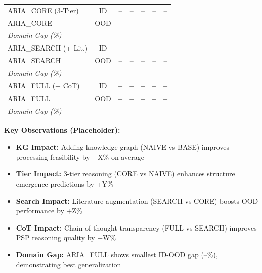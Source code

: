 \begin{table}[ht!]
\begin{tabular}{lcccccc}
ARIA\_CORE (3-Tier) & ID & -- & -- & -- & -- & -- \\
ARIA\_CORE & OOD & -- & -- & -- & -- & -- \\
\rowcolor{gray!10}
\textit{Domain Gap (\%)} & & \textit{--} & \textit{--} & \textit{--} & \textit{--} & \textit{--} \\
\midrule

ARIA\_SEARCH (+ Lit.) & ID & -- & -- & -- & -- & -- \\
ARIA\_SEARCH & OOD & -- & -- & -- & -- & -- \\
\rowcolor{gray!10}
\textit{Domain Gap (\%)} & & \textit{--} & \textit{--} & \textit{--} & \textit{--} & \textit{--} \\
\midrule

ARIA\_FULL (+ CoT) & ID & \textbf{--} & \textbf{--} & \textbf{--} & \textbf{--} & \textbf{--} \\
ARIA\_FULL & OOD & \textbf{--} & \textbf{--} & \textbf{--} & \textbf{--} & \textbf{--} \\
\rowcolor{gray!10}
\textit{Domain Gap (\%)} & & \textit{\textbf{--}} & \textit{\textbf{--}} & \textit{\textbf{--}} & \textit{\textbf{--}} & \textit{\textbf{--}} \\

\bottomrule
\end{tabular}
\vspace{0.3cm}

\noindent\textbf{Key Observations (Placeholder):}
\begin{itemize}[leftmargin=*,noitemsep]
    \item \textbf{KG Impact:} Adding knowledge graph (NAIVE vs BASE) improves processing feasibility by +X\% on average
    \item \textbf{Tier Impact:} 3-tier reasoning (CORE vs NAIVE) enhances structure emergence predictions by +Y\%
    \item \textbf{Search Impact:} Literature augmentation (SEARCH vs CORE) boosts OOD performance by +Z\%
    \item \textbf{CoT Impact:} Chain-of-thought transparency (FULL vs SEARCH) improves PSP reasoning quality by +W\%
    \item \textbf{Domain Gap:} ARIA\_FULL shows smallest ID-OOD gap (--\%), demonstrating best generalization
\end{itemize}


\end{table}
